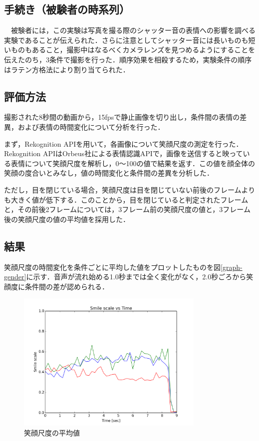 \documentclass[submit,techreq]{ec2014}
\begin{document}
\subsection{手続き（被験者の時系列）}

　被験者には，この実験は写真を撮る際のシャッター音の表情への影響を調べる実験であることが伝えられた．さらに注意としてシャッター音には長いものも短いものもあること，撮影中はなるべくカメラレンズを見つめるようにすることを伝えたのち，3条件で撮影を行った．順序効果を相殺するため，実験条件の順序はラテン方格法により割り当てられた．

\subsection{評価方法}

撮影された8秒間の動画から，15fpsで静止画像を切り出し，条件間の表情の差異，および表情の時間変化について分析を行った．

まず，Rekognition APIを用いて，各画像について笑顔尺度の測定を行った．Rekognition APIはOrbeus社による表情認識APIで，画像を送信すると映っている表情について笑顔尺度を解析し，0〜100の値で結果を返す．この値を顔全体の笑顔の度合いとみなし，値の時間変化と条件間の差異を分析した．

ただし，目を閉じている場合，笑顔尺度は目を閉じていない前後のフレームよりも大きく値が低下する．このことから，目を閉じていると判定されたフレームと，その前後2フレームについては，3フレーム前の笑顔尺度の値と，3フレーム後の笑顔尺度の値の平均値を採用した．

\subsection{結果}

笑顔尺度の時間変化を条件ごとに平均した値をプロットしたものを図\ref{graph-gender}に示す．音声が流れ始める1.0秒までは全く変化がなく，2.0秒ごろから笑顔度に条件間の差が認められる．

\begin{figure}[h!]
  \centering  
\includegraphics[width=90mm, bb=0 0 600 450]{images/avg2.png}
\caption{笑顔尺度の平均値}
  \label{graph-avg}
\end{figure}
\end{document}
